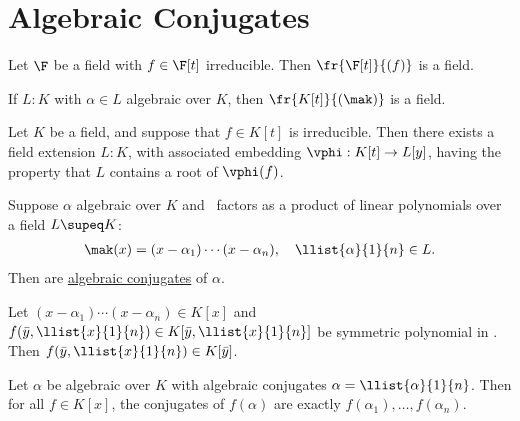 \documentclass[a4paper]{article}
\begin{document}
\section{Algebraic Conjugates}

\begin{tlemma}
  Let \( \F \) be a field with \( f\in \F[t] \) irreducible.
  Then \( \fr{\F[t]}{(f)} \) is a field.
\end{tlemma}

\begin{tcorollary}
  If \( L:K \) with \( \alpha\in L \) algebraic over \( K \), then \( \fr{K[t]}{(\mak)} \) is a field.
\end{tcorollary}

\begin{ttheorem}
  Let \( K \) be a field, and suppose that \( f\in K[t] \) is irreducible.
  Then there exists a field extension \( L:K \), with associated embedding \( \vphi:K[t]\to L[y] \), having the property that \( L \) contains a root of \( \vphi(f) \).
\end{ttheorem}

\begin{tdefinition}
  Suppose \( \alpha \) algebraic over \( K \) and \mak~factors as a product of linear polynomials over a field \( L\supeq K \): \begin{align*}
    \mak(x) = (x-\alpha_1)\cdots(x-\alpha_n),\quad \llist{\alpha}{1}{n}\in L.
  \end{align*}
  Then  are \ul{algebraic conjugates} of \( \alpha \).
\end{tdefinition}

\begin{tlemma}
  Let \( (x-\alpha_1)\cdots(x-\alpha_n)\in K[x] \) and \( f(\bar y,\llist{x}{1}{n})\in K[\bar y,\llist{x}{1}{n}] \) be symmetric polynomial in .
  Then \( f(\bar y,\llist{x}{1}{n}) \in K[\bar y] \).
\end{tlemma}

\begin{ttheorem}
  Let \( \alpha \) be algebraic over \( K \) with algebraic conjugates \( \alpha=\llist{\alpha}{1}{n} \).
  Then for all \( f\in K[x] \), the conjugates of \( f(\alpha) \) are exactly \( f(\alpha_1),\ldots,f(\alpha_n) \).
\end{ttheorem}
\end{document}
